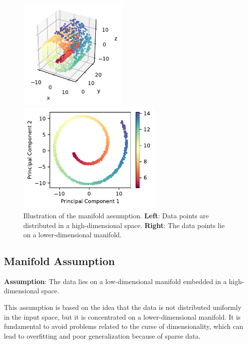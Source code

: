 \begin{figure}[h]
    \centering
    \begin{minipage}{0.4\textwidth}
        \centering
        \includegraphics[height=5.5cm]{images/ssl/swiss_roll_3d.pdf} %
    \end{minipage}\hfill
    \begin{minipage}{0.55\textwidth}
        \centering
        \includegraphics[height=5.5cm]{images/ssl/swiss_roll_pca.pdf} %
    \end{minipage}
    \caption{Illustration of the manifold assumption. 
        \textbf{Left}: Data points are distributed in a high-dimensional space. 
        \textbf{Right}: The data points lie on a lower-dimensional manifold.}
    \label{fig:swiss_roll}
\end{figure}

\subsection{Manifold Assumption}
\textbf{Assumption}: The data lies on a low-dimensional manifold embedded in a 
high-dimensional space.

This assumption is based on the idea that the data is not distributed uniformly 
in the input space, but it is concentrated on a lower-dimensional manifold.
It is fundamental to avoid problems related to the curse of dimensionality, 
which can lead to overfitting and poor generalization because of sparse data.

